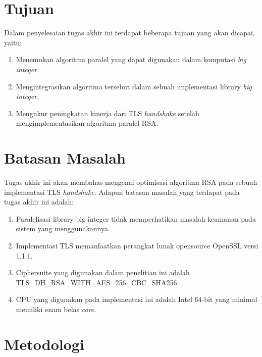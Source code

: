 \section{Tujuan}

Dalam penyelesaian tugas akhir ini terdapat beberapa tujuan yang akan dicapai, yaitu:
\begin{enumerate}
  \item Menemukan algoritma paralel yang dapat digunakan dalam komputasi \textit{big integer}.
  \item Mengintegrasikan algoritma tersebut dalam sebuah implementasi library \textit{big integer}.
  \item Mengukur peningkatan kinerja dari TLS \textit{handshake} setelah mengimplementasikan algoritma paralel RSA.
\end{enumerate}

\section{Batasan Masalah}

Tugas akhir ini akan membahas mengenai optimisasi algoritma RSA pada sebuah implementasi TLS \textit{handshake}. Adapun batasan masalah yang terdapat pada tugas akhir ini adalah:

\begin{enumerate}
  \item Paralelisasi library big integer tidak memperhatikan masalah keamanan pada sistem yang menggunakannya.
  \item Implementasi TLS memanfaatkan perangkat lunak opensource OpenSSL versi 1.1.1.
  \item Ciphersuite yang digunakan dalam penelitian ini adalah TLS\_DH\_RSA\_WITH\_AES\_256\_CBC\_SHA256.
  \item CPU yang digunakan pada implementasi ini adalah Intel 64-bit yang minimal memiliki enam belas \textit{core}.
\end{enumerate}

\section{Metodologi}

